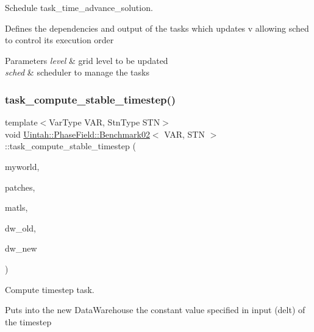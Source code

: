 Schedule task\+\_\+time\+\_\+advance\+\_\+solution. 

Defines the dependencies and output of the tasks which updates v allowing sched to control its execution order


\begin{DoxyParams}{Parameters}
{\em level} & grid level to be updated \\
\hline
{\em sched} & scheduler to manage the tasks \\
\hline
\end{DoxyParams}
\mbox{\label{classUintah_1_1PhaseField_1_1Benchmark02_a097ea9b2c6eb5485c1a5b92f40efaada}} 
\subsubsection{\texorpdfstring{task\+\_\+compute\+\_\+stable\+\_\+timestep()}{task\_compute\_stable\_timestep()}}
{\footnotesize\ttfamily template$<$Var\+Type V\+AR, Stn\+Type S\+TN$>$ \\
void \hyperlink{classUintah_1_1PhaseField_1_1Benchmark02}{Uintah\+::\+Phase\+Field\+::\+Benchmark02}$<$ V\+AR, S\+TN $>$\+::task\+\_\+compute\+\_\+stable\+\_\+timestep (\begin{DoxyParamCaption}\item[{Processor\+Group const $\ast$}]{myworld,  }\item[{Patch\+Subset const $\ast$}]{patches,  }\item[{Material\+Subset const $\ast$}]{matls,  }\item[{Data\+Warehouse $\ast$}]{dw\+\_\+old,  }\item[{Data\+Warehouse $\ast$}]{dw\+\_\+new }\end{DoxyParamCaption})\hspace{0.3cm}{\ttfamily [protected]}}



Compute timestep task. 

Puts into the new Data\+Warehouse the constant value specified in input (delt) of the timestep


